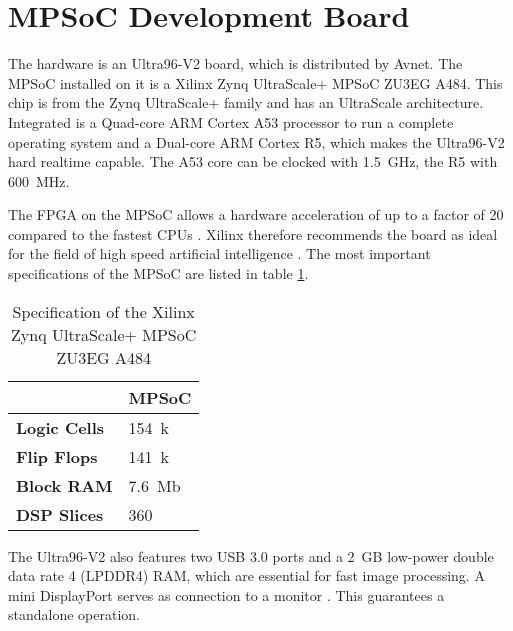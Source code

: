 \section{MPSoC Development Board}
\label{sec:board}

The hardware is an Ultra96-V2 board, which is distributed by Avnet.
The MPSoC installed on it is a Xilinx Zynq UltraScale+ MPSoC ZU3EG A484.
This chip is from the Zynq UltraScale+ family and has an UltraScale architecture.
Integrated is a Quad-core ARM Cortex A53 processor to run a complete operating system and a Dual-core ARM Cortex R5, which makes the Ultra96-V2 hard realtime capable.
The A53 core can be clocked with \SI{1.5}{GHz}, the R5 with \SI{600}{MHz}.

The FPGA on the MPSoC allows a hardware acceleration of up to a factor of 20 compared to the fastest CPUs \cite{acceleration_xilinx}.
Xilinx therefore recommends the board as ideal for the field of high speed artificial intelligence \cite{ai_resources_xilinx}.
The most important specifications of the MPSoC are listed in table \ref{tab:specs_MPSoC}.

\begin{table}[h]
	\caption{Specification of the Xilinx Zynq UltraScale+ MPSoC ZU3EG A484 \cite{xilinx_zynq}}
	\label{tab:specs_MPSoC}
	\centering
	\begin{tabular}{ll}
		\toprule
		& \textbf{MPSoC} \\
		\midrule
		\textbf{Logic Cells} & \SI{154}{k} \\
		\textbf{Flip Flops} & \SI{141}{k} \\
		\textbf{Block RAM} & \SI{7.6}{Mb} \\
		\textbf{DSP Slices} & 360 \\
		\bottomrule
	\end{tabular}
\end{table}

The Ultra96-V2 also features two USB 3.0 ports and a \SI{2}{GB} low-power double data rate 4 (LPDDR4) RAM, which are essential for fast image processing.
A mini DisplayPort serves as connection to a monitor \cite{avnet_ultra96v2}.
This guarantees a standalone operation.



